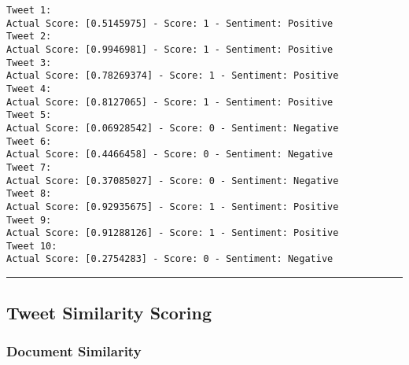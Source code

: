 \documentclass[11pt]{article}
\begin{document}
    \begin{Verbatim}[commandchars=\\\{\}]
Tweet 1:
Actual Score: [0.5145975] - Score: 1 - Sentiment: Positive
Tweet 2:
Actual Score: [0.9946981] - Score: 1 - Sentiment: Positive
Tweet 3:
Actual Score: [0.78269374] - Score: 1 - Sentiment: Positive
Tweet 4:
Actual Score: [0.8127065] - Score: 1 - Sentiment: Positive
Tweet 5:
Actual Score: [0.06928542] - Score: 0 - Sentiment: Negative
Tweet 6:
Actual Score: [0.4466458] - Score: 0 - Sentiment: Negative
Tweet 7:
Actual Score: [0.37085027] - Score: 0 - Sentiment: Negative
Tweet 8:
Actual Score: [0.92935675] - Score: 1 - Sentiment: Positive
Tweet 9:
Actual Score: [0.91288126] - Score: 1 - Sentiment: Positive
Tweet 10:
Actual Score: [0.2754283] - Score: 0 - Sentiment: Negative
    \end{Verbatim}

    \begin{center}\rule{0.5\linewidth}{0.5pt}\end{center}

    \hypertarget{tweet-similarity-scoring}{%
\subsection{Tweet Similarity Scoring}\label{tweet-similarity-scoring}}

    \hypertarget{document-similarity}{%
\subsubsection{Document Similarity}\label{document-similarity}}
\end{document}
